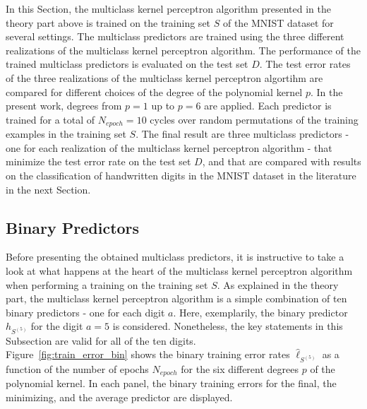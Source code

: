 In this Section, the multiclass kernel perceptron algorithm presented in the theory part above is trained on the training set $S$ of the MNIST dataset for several settings. The multiclass predictors are trained using the three different realizations of the multiclass kernel perceptron algorithm. The performance of the trained multiclass predictors is evaluated on the test set $D$. The test error rates of the three realizations of the multiclass kernel perceptron algortihm are compared for different choices of the degree of the polynomial kernel $p$. In the present work, degrees from $p=1$ up to $p=6$ are applied. Each predictor is trained for a total of $N_{epoch}=10$ cycles over random permutations of the training examples in the training set $S$. The final result are three multiclass predictors - one for each realization of the multiclass kernel perceptron algorithm - that minimize the test error rate on the test set $D$, and that are compared with results on the classification of handwritten digits in the MNIST dataset in the literature in the next Section.

\subsection{Binary Predictors}\label{subsec:bin_pred}
Before presenting the obtained multiclass predictors, it is instructive to take a look at what happens at the heart of the multiclass kernel perceptron algorithm when performing a training on the training set $S$. As explained in the theory part, the multiclass kernel perceptron algorithm is a simple combination of ten binary predictors - one for each digit $a$. Here, exemplarily, the binary predictor $h_{S^{(5)}}$ for the digit $a=5$ is considered. Nonetheless, the key statements in this Subsection are valid for all of the ten digits. \\

Figure~\ref{fig:train_error_bin} shows the binary training error rates $\hat{\ell}_{S^{(5)}}$ as a function of the number of epochs $N_{epoch}$ for the six different degrees $p$ of the polynomial kernel. In each panel, the binary training errors for the final, the minimizing, and the average predictor are displayed. 

